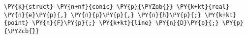 \begin{Verbatim}[commandchars=\\\{\}]
    \PY{k}{struct} \PY{n+nf}{conic} \PY{p}{\PYZob{}} \PY{k+kt}{real} \PY{n}{e}\PY{p}{,} \PY{n}{p}\PY{p}{,} \PY{n}{h}\PY{p}{;} \PY{k+kt}{point} \PY{n}{F}\PY{p}{;} \PY{k+kt}{line} \PY{n}{D}\PY{p}{;} \PY{p}{\PYZcb{}}
\end{Verbatim}
